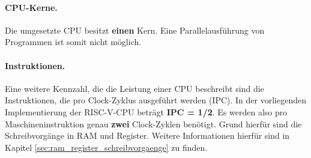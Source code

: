 \paragraph{CPU-Kerne.} Die umgesetzte CPU besitzt \textbf{einen} Kern.
Eine Parallelausführung von Programmen ist somit nicht möglich.

\paragraph{Instruktionen.} Eine weitere Kennzahl, die die Leistung einer
CPU beschreibt sind die Instruktionen, die pro Clock-Zyklus ausgeführt
werden (IPC). 
In der vorliegenden Implementierung der RISC-V-CPU beträgt \textbf{IPC =
1/2}. Es werden also pro Maschineninstruktion genau \textbf{zwei}
Clock-Zyklen benötigt. Grund hierfür sind die Schreibvorgänge in RAM und
Register. Weitere Informationen hierfür sind in Kapitel
\ref{sec:ram_register_schreibvorgaenge} zu finden.


